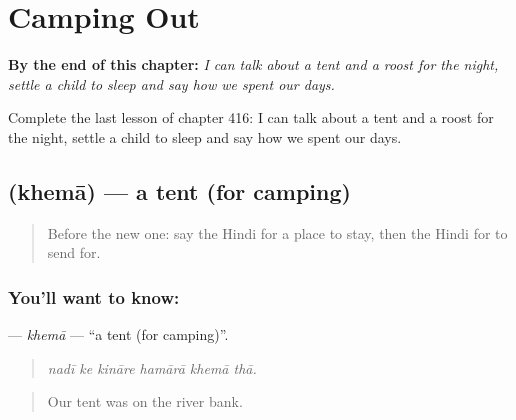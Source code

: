 
\chapter{Camping Out}
\label{ch:hi-camping-out}

\begin{chapteropening}
\textbf{By the end of this chapter:} \emph{I can talk about a tent and a roost for the night, settle a child to sleep and say how we spent our days.}

Complete the last lesson of chapter 416: I can talk about a tent and a roost for the night, settle a child to sleep and say how we spent our days.
\end{chapteropening}

\section[\texorpdfstring{\hi{ख़ेमा} (khemā)}{ख़ेमा (khemā)}]{ (khemā) — a tent (for camping)}

\label{lesson:HI-C416-khema}



\begin{quote}
Before the new one: say the Hindi for a place to stay, then the Hindi for to send for.
\end{quote}

\subsection*{You'll want to know: }
\textbf{} — \emph{khemā} — \textquotedblleft{}a tent (for camping)\textquotedblright{}.

\begin{quote}
     
\end{quote}

\begin{quote}
\emph{nadī ke kināre hamārā khemā thā.}
\end{quote}

\begin{quote}
Our tent was on the river bank.
\end{quote}

